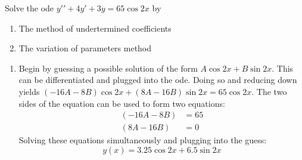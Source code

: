Solve the ode $y\prime\prime+4y\prime+3y=65\cos 2x$ by
\begin{enumerate}
	\item The method of undertermined coefficients
	\item The variation of parameters method
\end{enumerate}

\begin{enumerate}
	\item Begin by guessing a possible solution of the form $A\cos 2x +B\sin 2x$. This can be differentiated and plugged into the ode. Doing so and reducing down yields $(-16A-8B)\cos 2x +(8A-16B)\sin 2x=65\cos 2x$. The two sides of the equation can be used to form two equations:
\begin{align*}
	(-16A-8B)&=65\\
	(8A-16B)&=0
\end{align*}
Solving these equations simultaneously and plugging into the guess:
\begin{equation*}
	\boxed{y(x)=3.25\cos 2x +6.5 \sin 2x}
\end{equation*}

\end{enumerate}
